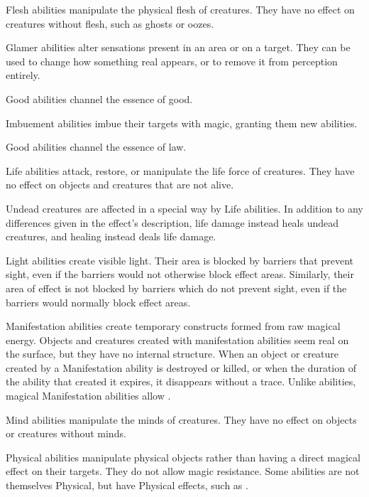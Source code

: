      Flesh abilities manipulate the physical flesh of creatures.
    They have no effect on creatures without flesh, such as ghosts or oozes.

     Glamer abilities alter sensations present in an area or on a target.
    They can be used to change how something real appears, or to remove it from perception entirely.

     Good abilities channel the essence of good.

     Imbuement abilities imbue their targets with magic, granting them new abilities.

     Good abilities channel the essence of law.

     Life abilities attack, restore, or manipulate the life force of creatures.
    They have no effect on objects and creatures that are not alive.
    \par Undead creatures are affected in a special way by Life abilities.
    In addition to any differences given in the effect's description, life damage instead heals undead creatures, and healing instead deals life damage.

     Light abilities create visible light.
    Their area is blocked by barriers that prevent sight, even if the barriers would not otherwise block effect areas.
    Similarly, their area of effect is not blocked by barriers which do not prevent sight, even if the barriers would normally block effect areas.

     Manifestation abilities create temporary constructs formed from raw magical energy.
    Objects and creatures created with manifestation abilities seem real on the surface, but they have no internal structure.
    When an object or creature created by a Manifestation ability is destroyed or killed, or when the duration of the ability that created it expires, it disappears without a trace.
    Unlike  abilities, magical Manifestation abilities allow .

     Mind abilities manipulate the minds of creatures.
    They have no effect on objects or creatures without minds.

     Physical abilities manipulate physical objects rather than having a direct magical effect on their targets.
    They do not allow magic resistance.
    Some abilities are not themselves Physical, but have Physical effects, such as .

